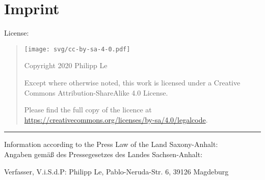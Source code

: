 %
%
%

\chapter*{Imprint}

{
\small

License:

\begin{quote}
	\texttt{[image: svg/cc-by-sa-4-0.pdf]}
		
	Copyright \textcopyright{} 2020 Philipp Le
	
	Except where otherwise noted, this work is licensed under a
	Creative Commons Attribution-ShareAlike 4.0 License.
	
	Please find the full copy of the licence at \url{https://creativecommons.org/licenses/by-sa/4.0/legalcode}.
\end{quote}

\vspace{1.5em}

\hrule{}

\vspace{1.5em}

Information according to the Press Law of the Land Saxony-Anhalt:\\
Angaben gem\"a{}{\ss} des Pressegesetzes des Landes Sachsen-Anhalt:

Verfasser, V.i.S.d.P: Philipp Le, Pablo-Neruda-Str. 6, 39126 Magdeburg

}
